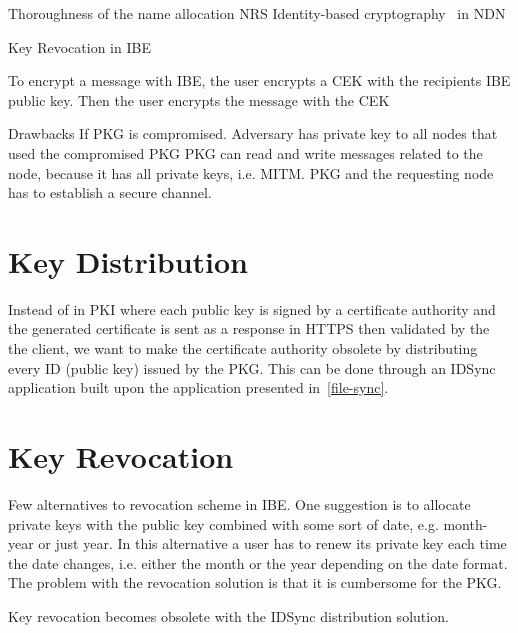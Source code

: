 
Thoroughness of the name allocation \gls{NRS} 
Identity-based cryptography~\cite{DBLP:conf/icnp/ZhangCXWSW11} in \gls{NDN}

Key Revocation in IBE ~\cite{DBLP:journals/iacr/BoldyrevaGK12} 

To encrypt a message with \gls{IBE}, the user encrypts a \gls{CEK} with the recipients \gls{IBE} public key.
Then the user encrypts the message with the \gls{CEK}~\cite[section 2.2.2]{rfc5408}

Drawbacks
If \gls{PKG} is compromised. Adversary has private key to all nodes that used the compromised \gls{PKG}
\gls{PKG} can read and write messages related to the node, because it has all private keys, i.e. \gls{MITM}.
\gls{PKG} and the requesting node has to establish a secure channel. 


\section{Key Distribution}
Instead of in \gls{PKI} where each public key is signed by a certificate authority and the generated certificate is sent as a response in \gls{HTTPS} then validated by the the client, we want to make the certificate authority obsolete by distributing every \gls{ID} (public key) issued by the \gls{PKG}.
This can be done through an IDSync application built upon the application presented in~\autoref{file-sync}.

\section{Key Revocation}
Few alternatives to revocation scheme in \gls{IBE}.
One suggestion is to allocate private keys with the public key combined with some sort of date, e.g. month-year or just year. 
In this alternative a user has to renew its private key each time the date changes, i.e. either the month or the year depending on the date format.
The problem with the revocation solution is that it is cumbersome for the \gls{PKG}.


Key revocation becomes obsolete with the IDSync distribution solution. 
